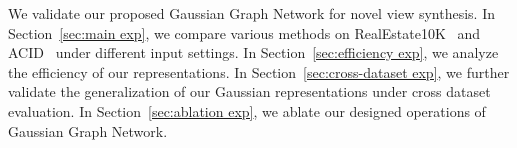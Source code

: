 We validate our proposed Gaussian Graph Network for novel view synthesis. In Section~\ref{sec:main exp}, we compare various methods on RealEstate10K~\cite{RealEstate10K2018} and ACID~\cite{ACID2021ICCV} under different input settings. In Section~\ref{sec:efficiency exp}, we analyze the efficiency of our representations. In Section~\ref{sec:cross-dataset exp}, we further validate the generalization of our Gaussian representations under cross dataset evaluation. In Section~\ref{sec:ablation exp}, we ablate our designed operations of Gaussian Graph Network.



